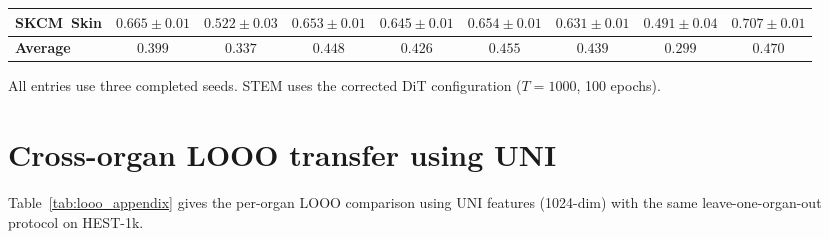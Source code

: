 \documentclass[10pt,twocolumn,letterpaper]{article}
\newcommand{\best}[1]{{\bfseries\boldmath #1}}
\begin{document}
\begin{table}[t]
{\begin{tabular}{l cccc cccc}
SKCM~\tiny{Skin}       & $0.665{\pm}0.01$ & $0.522{\pm}0.03$ & $0.653{\pm}0.01$ & $0.645{\pm}0.01$ & $0.654{\pm}0.01$ & $0.631{\pm}0.01$ & $0.491{\pm}0.04$ & \best{$0.707{\pm}0.01$} \\
\midrule
\textbf{Average}       & $0.399$ & $0.337$ & $0.448$ & $0.426$ & $0.455$ & $0.439$ & $0.299$ & \best{$0.470$} \\
\bottomrule
\end{tabular}%
}
\begin{minipage}{\linewidth}
\footnotesize
All entries use three completed seeds. STEM uses the corrected DiT configuration ($T=1000$, 100 epochs).
\end{minipage}
\end{table}

\section{Cross-organ LOOO transfer using UNI}
\label{app:looo_expanded}

Table~\ref{tab:looo_appendix} gives the per-organ LOOO comparison using UNI features
(1024-dim) with the same leave-one-organ-out protocol on HEST-1k.
\end{document}
